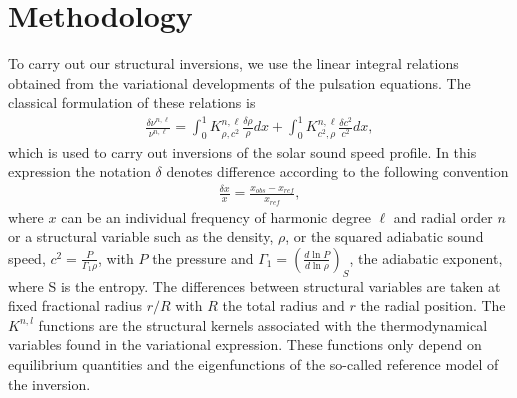 \documentclass[a4paper,fleqn,usenatbib]{mnras}
\begin{document}
\section{Methodology} \label{sec:method}
To carry out our structural inversions, we use the linear integral relations obtained from the variational developments of the pulsation equations. The classical formulation of these relations is
\begin{align}
\frac{\delta \nu^{n,\ell}}{\nu^{n,\ell}}=\int_{0}^{1}K_{\rho,c^{2}}^{n,\ell}\frac{\delta \rho}{\rho}dx + \int_{0}^{1}K_{c^{2},\rho}^{n,\ell}\frac{\delta c^{2}}{c^{2}}dx,
\end{align}
which is used to carry out inversions of the solar sound speed profile. In this expression the notation $\delta$ denotes difference according to the following convention
\begin{align}
\frac{\delta x}{x} = \frac{x_{obs}-x_{ref}}{x_{ref}},
\end{align}
where $x$ can be an individual frequency of harmonic degree $\ell$ and radial order $n$ or a structural variable such as the density, $\rho$, or the squared adiabatic sound speed, $c^{2}=\frac{P}{\Gamma_{1}\rho}$, with $P$ the pressure and $\Gamma_{1}=\left( \frac{d \ln P}{d  \ln \rho}\right)_{S}$, the adiabatic exponent, where S is the entropy. The differences between structural variables are taken at fixed fractional radius $r/R$ with $R$ the total radius and $r$ the radial position. The $K^{n,l}$ functions are the structural kernels associated with the thermodynamical variables found in the variational expression. These functions only depend on equilibrium quantities and the eigenfunctions of the so-called reference model of the inversion. 
\end{document}
